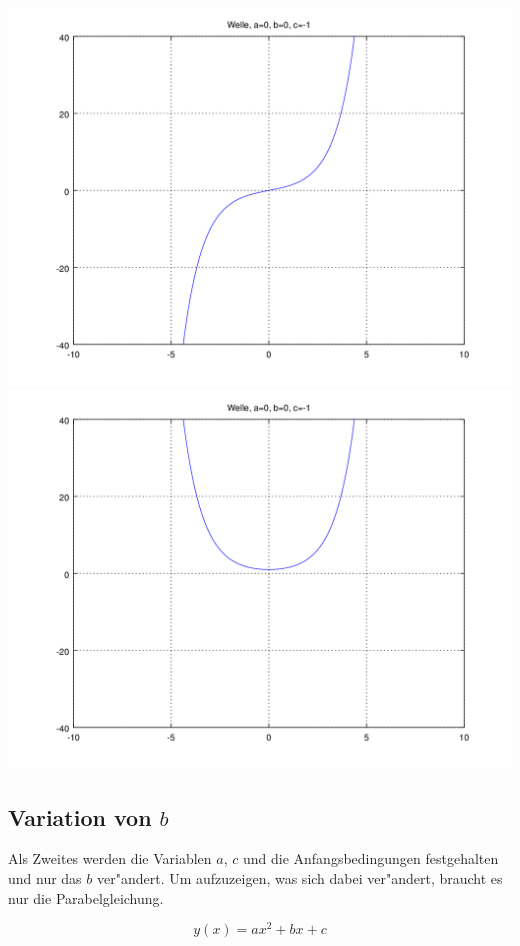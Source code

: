 \noindent
\includegraphics[scale=0.35]{./wellen/images/basicfunctions/sinh.png}
\includegraphics[scale=0.35]{./wellen/images/basicfunctions/cosh.png}

\subsection{Variation von \texorpdfstring{$b$}{b}}

Als Zweites werden die Variablen $a$, $c$ und die Anfangsbedingungen 
festgehalten und nur das $b$ ver"andert. Um aufzuzeigen, was sich dabei 
ver"andert, braucht es nur die Parabelgleichung.

\begin{equation*}
	y(x) = ax^2 + bx + c
\end{equation*}

